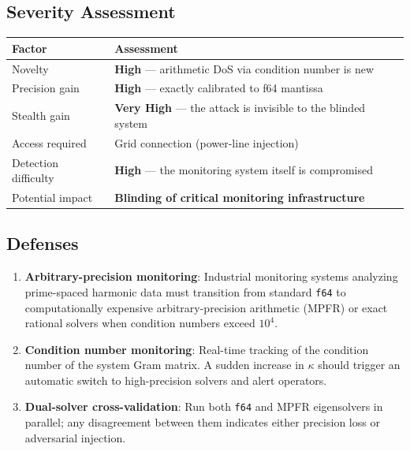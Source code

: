 \documentclass[11pt,a4paper]{article}
\begin{document}
\subsection{Severity Assessment}

\begin{center}
\begin{tabular}{@{}ll@{}}
\toprule
\textbf{Factor} & \textbf{Assessment} \\
\midrule
Novelty & \textbf{High} --- arithmetic DoS via condition number is new \\
Precision gain & \textbf{High} --- exactly calibrated to f64 mantissa \\
Stealth gain & \textbf{Very High} --- the attack is invisible to the blinded system \\
Access required & Grid connection (power-line injection) \\
Detection difficulty & \textbf{High} --- the monitoring system itself is compromised \\
Potential impact & \textbf{Blinding of critical monitoring infrastructure} \\
\bottomrule
\end{tabular}
\end{center}

\subsection{Defenses}

\begin{enumerate}
  \item \textbf{Arbitrary-precision monitoring}: Industrial monitoring
    systems analyzing prime-spaced harmonic data must transition from
    standard \texttt{f64} to computationally expensive arbitrary-precision
    arithmetic (MPFR) or exact rational solvers when condition numbers
    exceed $10^4$.
  \item \textbf{Condition number monitoring}: Real-time tracking of
    the condition number of the system Gram matrix. A sudden increase
    in $\kappa$ should trigger an automatic switch to high-precision
    solvers and alert operators.
  \item \textbf{Dual-solver cross-validation}: Run both \texttt{f64}
    and MPFR eigensolvers in parallel; any disagreement between them
    indicates either precision loss or adversarial injection.
\end{enumerate}

\end{document}
